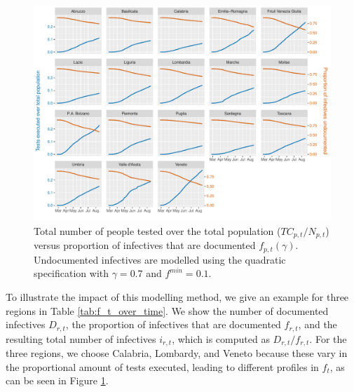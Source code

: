 \documentclass[12pt]{article}
\begin{document}
	\begin{figure}[H]
	    \centering
	    \includegraphics[width=\textwidth]{output/tamponiprop_vs_ft.pdf}
	    \caption{Total number of people tested over the total population ($TC_{p,t} / N_{p,t}$) versus proportion of infectives that are documented $f_{p,t}(\gamma)$. Undocumented infectives are modelled using the quadratic specification with $\gamma = 0.7$ and $f^{min}=0.1$.}
	    \label{fig:tamponiprop_versus_ft}
	\end{figure}
	
	To illustrate the impact of this modelling method, we give an example for three regions in Table \ref{tab:f_t_over_time}. We show the number of documented infectives $D_{r,t}$, the proportion of infectives that are documented $f_{r,t}$, and the resulting total number of infectives $i_{r,t}$, which is computed as $D_{r,t} / f_{r,t}$. For the three regions, we choose Calabria, Lombardy, and Veneto because these vary in the proportional amount of tests executed, leading to different profiles in $f_t$, as can be seen in Figure \ref{fig:tamponiprop_versus_ft}.
	
\end{document}
